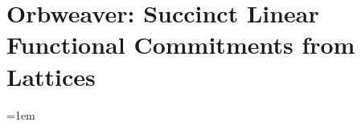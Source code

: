 \documentclass[11pt]{report}
\begin{document}
\chapter[Orbweaver: Succinct Linear Functional Commitments from Lattices]{Orbweaver\protect\footnotemark: Succinct Linear Functional Commitments from Lattices}
\label{ch:orbweaver}




\begingroup
\emergencystretch=1em
\printbibliography
\endgroup


\newpage
\appendix


\end{document}
